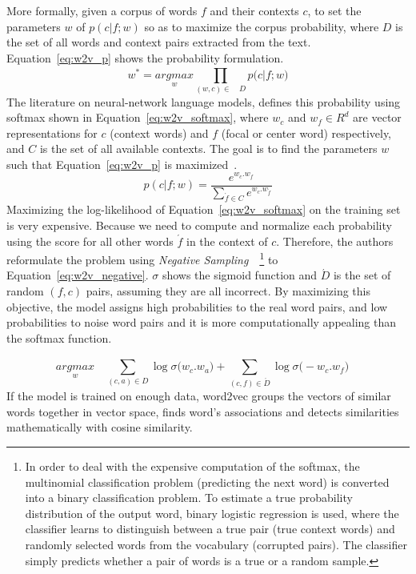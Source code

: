 More formally, given a corpus of words $f$ and their contexts $c$, to set the parameters $w$ of $p(c|f; w)$ so as to maximize the corpus probability, where $D$ is the set of all words and context pairs extracted from the text. Equation~\ref{eq:w2v_p} shows the probability formulation.
\begin{equation}
\label{eq:w2v_p}
w^*=\underset { w  }{ { argmax } } \prod _{ (w,c)\in \quad D }^{  }{ p(c|f; } w )
\end{equation}
The literature on neural-network language models, defines this probability using softmax shown in Equation~\ref{eq:w2v_softmax}, where $w_c$ and $ w_f\in R^d$ are vector representations for $c$ (context words) and $f$ (focal or center word) respectively, and
$C$ is the set of all available contexts. The goal is to find the parameters $w$ such that Equation~\ref{eq:w2v_p} is maximized~. 
\begin{equation}
\label{eq:w2v_softmax}
p(c|f;w)=\frac { { e }^{ w_{ c }.w_{ f } } }{ \sum _{ \acute { f } \in C }^{  }{ { e }^{ w_{ c }.w_{ \acute { f }  } } }  } 
\end{equation}
Maximizing the log-likelihood of Equation~\ref{eq:w2v_softmax} on the training set is very expensive. Because we need to compute and normalize each probability using the score for all other words  $\acute { f }$ in the context of $c$. Therefore, the authors reformulate the problem using \emph{Negative Sampling}~~\footnote{ In order to deal with the expensive computation of the softmax, the multinomial classification problem (predicting the next word) is converted into a binary classification problem. To estimate a true probability distribution of the output word, binary logistic regression is used, where the classifier learns to distinguish between a true pair (true context words) and randomly selected words from the vocabulary (corrupted pairs). The classifier simply predicts whether a pair of words is a true or a random sample.} to Equation~\ref{eq:w2v_negative}. $ \sigma$ shows the sigmoid function and $\acute{D}$ is the set of random $(f, c)$ pairs, assuming they are all incorrect. By maximizing this objective, the model assigns high probabilities to the real word pairs, and low probabilities to noise word pairs and it is more computationally appealing than the softmax function.

\begin{equation}
\label{eq:w2v_negative}
\underset { w }{ { argmax } } \quad \sum _{ (c,a)\in D }^{  }{ \log { \sigma ( } w_{ c }.w_{ a }) } +\sum _{ (c,f)\in \acute { D }  }^{  }{ \log { \sigma ( } -w_{ c }.w_{ f })\quad  } 
\end{equation}
If the model is trained on enough data, word2vec groups the vectors of similar words together in vector space, finds word’s associations and detects similarities mathematically with cosine similarity. 
